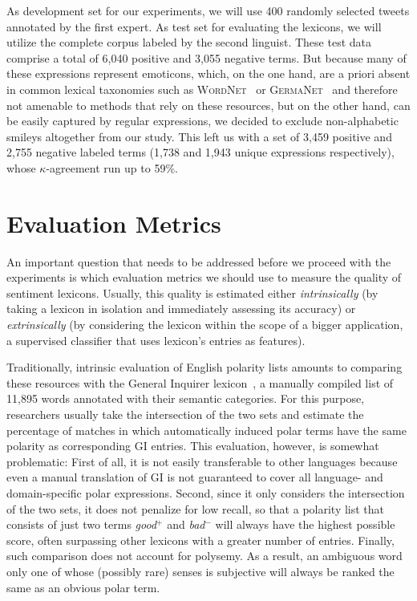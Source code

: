 As development set for our experiments, we will use 400 randomly
selected tweets annotated by the first expert.  As test set for
evaluating the lexicons, we will utilize the complete corpus labeled
by the second linguist.  These test data comprise a total of 6,040
positive and 3,055 negative terms.  But because many of these
expressions represent emoticons, which, on the one hand, are a priori
absent in common lexical taxonomies such as
\textsc{WordNet}~\cite{Miller:95,Miller:07} or
\textsc{GermaNet}~\cite{Hamp:97} and therefore not amenable to methods
that rely on these resources, but on the other hand, can be easily
captured by regular expressions, we decided to exclude non-alphabetic
smileys altogether from our study.  This left us with a set of 3,459
positive and 2,755 negative labeled terms (1,738 and 1,943 unique
expressions respectively), whose $\kappa$-agreement run up to 59\%.

\section{Evaluation Metrics}\label{sec:snt-lex:eval-metrics}

An important question that needs to be addressed before we proceed
with the experiments is which evaluation metrics we should use to
measure the quality of sentiment lexicons.  Usually, this quality is
estimated either \textit{intrinsically} (by taking a lexicon in
isolation and immediately assessing its accuracy) or
\textit{extrinsically} (by considering the lexicon within the scope of
a bigger application, \eg{} a supervised classifier that uses
lexicon's entries as features).

Traditionally, intrinsic evaluation of English polarity lists amounts
to comparing these resources with the General Inquirer
lexicon~\cite[GI; ][]{Stone:66}, a manually compiled list of 11,895
words annotated with their semantic categories.  For this purpose,
researchers usually take the intersection of the two sets and estimate
the percentage of matches in which automatically induced polar terms
have the same polarity as corresponding GI entries.  This evaluation,
however, is somewhat problematic: First of all, it is not easily
transferable to other languages because even a manual translation of
GI is not guaranteed to cover all language- and domain-specific polar
expressions.  Second, since it only considers the intersection of the
two sets, it does not penalize for low recall, so that a polarity list
that consists of just two terms \textit{good}$^+$ and \textit{bad}$^-$
will always have the highest possible score, often surpassing other
lexicons with a greater number of entries.  Finally, such comparison
does not account for polysemy.  As a result, an ambiguous word only
one of whose (possibly rare) senses is subjective will always be
ranked the same as an obvious polar term.

